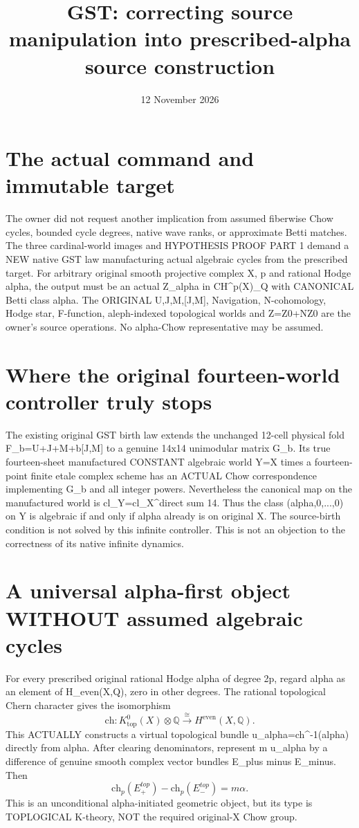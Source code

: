 \documentclass{article}
\title{GST: correcting source manipulation into prescribed-alpha source construction}
\date{12 November 2026}
\begin{document}
\maketitle

\section{The actual command and immutable target}
The owner did not request another implication from assumed fiberwise Chow
cycles, bounded cycle degrees, native wave ranks, or approximate Betti matches.
The three cardinal-world images and HYPOTHESIS PROOF PART 1 demand a NEW
native GST law manufacturing actual algebraic cycles from the prescribed target.
For arbitrary original smooth projective complex X, p and rational
Hodge alpha, the output must be an actual Z_alpha in CH^p(X)_Q
with CANONICAL Betti class alpha. The ORIGINAL U,J,M,[J,M],
Navigation, N-cohomology, Hodge star, F-function, aleph-indexed
topological worlds and Z=Z0+NZ0 are the owner's source operations.
No alpha-Chow representative may be assumed.

\section{Where the original fourteen-world controller truly stops}
The existing original GST birth law extends the unchanged 12-cell physical
fold F_b=U+J+M+b[J,M] to a genuine 14x14 unimodular matrix G_b.
Its true fourteen-sheet manufactured CONSTANT algebraic world
Y=X times a fourteen-point finite etale complex scheme has an
ACTUAL Chow correspondence implementing G_b and all integer powers.
Nevertheless the canonical map on the manufactured world is
cl_Y=cl_X^{direct sum 14}. Thus the class (alpha,0,...,0) on Y
is algebraic if and only if alpha already is on original X.
The source-birth condition is not solved by this infinite controller.
This is not an objection to the correctness of its native infinite dynamics.

\section{A universal alpha-first object WITHOUT assumed algebraic cycles}
For every prescribed original rational Hodge alpha of degree 2p,
regard alpha as an element of H_even(X,Q), zero in other degrees.
The rational topological Chern character gives the isomorphism
\[
\mathrm{ch}:K^0_{\mathrm{top}}(X)\otimes\mathbb Q
 \overset{\cong}{\longrightarrow}H^{\mathrm{even}}(X,\mathbb Q).
\]
This ACTUALLY constructs a virtual topological bundle
u_alpha=ch^{-1}(alpha) directly from alpha.
After clearing denominators, represent m u_alpha by a difference
of genuine smooth complex vector bundles E_plus minus E_minus.
Then
\[
\boxed{\mathrm{ch}_p(E_+^{top})-\mathrm{ch}_p(E_-^{top})=m\alpha.}
\]
This is an unconditional alpha-initiated geometric object, but its
type is TOPLOGICAL K-theory, NOT the required original-X Chow group.
\end{document}
